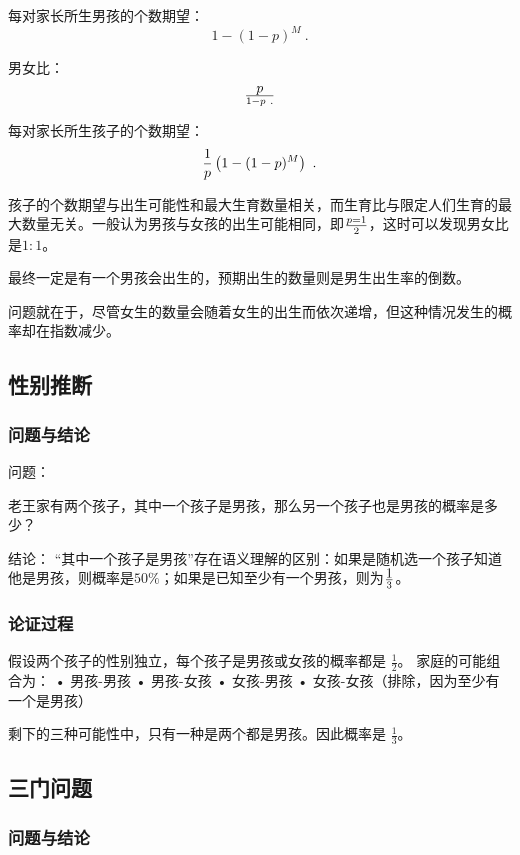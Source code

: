 每对家长所生男孩的个数期望：
\begin{equation}
1-(1-p)^M~.
\end{equation}

男女比：
\begin{equation}
p\over 1-p~.
\end{equation}

每对家长所生孩子的个数期望：
\begin{equation}
{1\over p}\left(1-(1-p)^M\right)~.
\end{equation}

孩子的个数期望与出生可能性和最大生育数量相关，而生育比与限定人们生育的最大数量无关。一般认为男孩与女孩的出生可能相同，即$p=1\over2$，这时可以发现男女比是$1:1$。

最终一定是有一个男孩会出生的，预期出生的数量则是男生出生率的倒数。

问题就在于，尽管女生的数量会随着女生的出生而依次递增，但这种情况发生的概率却在指数减少。

\subsection{性别推断}

\subsubsection{问题与结论}

问题：

老王家有两个孩子，其中一个孩子是男孩，那么另一个孩子也是男孩的概率是多少？

结论：
“其中一个孩子是男孩”存在语义理解的区别：如果是随机选一个孩子知道他是男孩，则概率是$50\%$；如果是已知至少有一个男孩，则为$\displaystyle 1\over 3$。

\subsubsection{论证过程}
假设两个孩子的性别独立，每个孩子是男孩或女孩的概率都是 $\frac{1}{2}$。
家庭的可能组合为：
	•	男孩-男孩
	•	男孩-女孩
	•	女孩-男孩
	•	女孩-女孩（排除，因为至少有一个是男孩）

剩下的三种可能性中，只有一种是两个都是男孩。因此概率是 $\frac{1}{3}$。

\subsection{三门问题}

\subsubsection{问题与结论}

